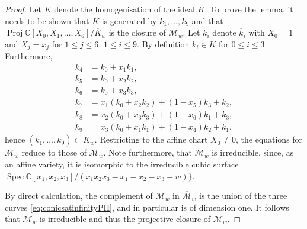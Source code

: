 \documentclass[a4paper,reqno]{amsart}
\numberwithin{equation}{section}
\newcommand{\C}{\mathbb{C}}
\numberwithin{equation}{section}
\begin{document}
\begin{proof} 
Let $\overline{K}$ denote the homogenisation of the ideal $K$. To prove the lemma, it needs to be shown that $\overline{K}$  is generated by $\overline{k}_1,\ldots,\overline{k}_9$ and that $\operatorname{Proj} \C[X_0,X_1,\dots,X_6]/\overline{K}_w$ is the closure of $\mathcal{M}_w$.  
Let $k_i$ denote $\overline{k}_i$ with $X_0=1$ and $X_j=x_j$ for $1\leq j\leq 6$, $1\leq i\leq 9$.
By definition $k_i\in K$ for $0\leq i\leq 3$. Furthermore,
\begin{equation*}
\begin{aligned}
    k_4&=k_0+x_1 k_1,\\
    k_5&=k_0+x_2 k_2,\\
    k_6&=k_0+x_3 k_3,\\
    k_7&= x_1 (k_0+x_2 k_2)+ (1-x_5) k_3+k_2,    \\
    k_8&= x_2 (k_0+x_3 k_3)+ (1-x_6) k_1+k_3,    \\
    k_9&= x_3 (k_0+x_1 k_1)+ (1-x_4) k_2+k_1.
\end{aligned}
\end{equation*}
hence $(\overline{k}_1,\ldots,\overline{k}_9)\subset \overline{K}_w$.
Restricting to the affine chart $X_0\neq0$, the equations for $\overline{\mathcal{M}}_w$ reduce to those of $\mathcal{M}_w$. Note furthermore, that $\mathcal{M}_w$ is irreducible, since, as an affine variety, it is isomorphic to the irreducible cubic surface $\operatorname{Spec}\C[x_1,x_2,x_3]/(x_1 x_2 x_3 - x_1 -x_2 -x_3  + w)\}$.

By direct calculation, the complement of $\mathcal{M}_w$ in $\overline{\mathcal{M}}_w$ is the union of the three curves \eqref{eq:conicsatinfinityPII}, and in particular is of dimension one. 
It follows that $\overline{\mathcal{M}}_w$ is irreducible and thus the projective closure of $\mathcal{M}_w$.
\end{proof}
\end{document}
